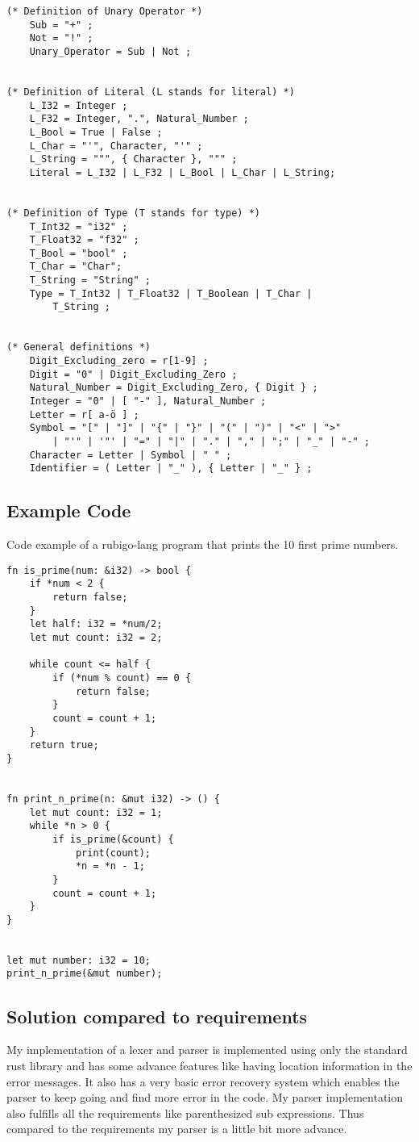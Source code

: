 \documentclass[12pt]{article}
\begin{document}
\begin{verbatim}
(* Definition of Unary Operator *)
    Sub = "+" ;
    Not = "!" ;
    Unary_Operator = Sub | Not ;


(* Definition of Literal (L stands for literal) *)
    L_I32 = Integer ;
    L_F32 = Integer, ".", Natural_Number ;
    L_Bool = True | False ;
    L_Char = "'", Character, "'" ;
    L_String = """, { Character }, """ ;  
    Literal = L_I32 | L_F32 | L_Bool | L_Char | L_String;


(* Definition of Type (T stands for type) *)
    T_Int32 = "i32" ;
    T_Float32 = "f32" ;
    T_Bool = "bool" ;
    T_Char = "Char";
    T_String = "String" ;  
    Type = T_Int32 | T_Float32 | T_Boolean | T_Char |
        T_String ;


(* General definitions *)
    Digit_Excluding_zero = r[1-9] ;
    Digit = "0" | Digit_Excluding_Zero ;
    Natural_Number = Digit_Excluding_Zero, { Digit } ;
    Integer = "0" | [ "-" ], Natural_Number ;
    Letter = r[ a-ö ] ;
    Symbol = "[" | "]" | "{" | "}" | "(" | ")" | "<" | ">"
        | "'" | '"' | "=" | "|" | "." | "," | ";" | "_" | "-" ;
    Character = Letter | Symbol | " " ;
    Identifier = ( Letter | "_" ), { Letter | "_" } ;
	\end{verbatim}

    \subsection{Example Code}
    Code example of a rubigo-lang program that prints the 10 first prime numbers.
	\begin{verbatim}
fn is_prime(num: &i32) -> bool {
    if *num < 2 {
        return false;
    }
    let half: i32 = *num/2;
    let mut count: i32 = 2;

    while count <= half {
        if (*num % count) == 0 {
            return false;
        }
        count = count + 1;
    }
    return true;
}


fn print_n_prime(n: &mut i32) -> () {
    let mut count: i32 = 1;
    while *n > 0 {
        if is_prime(&count) {
            print(count);
            *n = *n - 1;
        }
        count = count + 1;
    }
}


let mut number: i32 = 10;
print_n_prime(&mut number);

	\end{verbatim}


    \subsection{Solution compared to requirements}
 	My implementation of a lexer and parser is implemented using only the standard rust library and has some advance features like having location information in the error messages. It also has a very basic error recovery system which enables the parser to keep going and find more error in the code. My parser implementation also fulfills all the requirements like parenthesized sub expressions. Thus compared to the requirements my parser is a little bit more advance.
\end{document}
